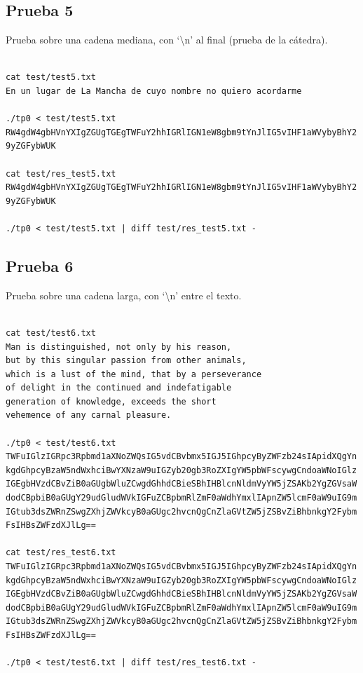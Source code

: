 \documentclass[titlepage,a4paper]{article}
\begin{document}
\subsection{Prueba 5}
Prueba sobre una cadena mediana, con `\textbackslash n' al final (prueba de la cátedra).
\begin{lstlisting}[style=test_run_style]

cat test/test5.txt
En un lugar de La Mancha de cuyo nombre no quiero acordarme

./tp0 < test/test5.txt
RW4gdW4gbHVnYXIgZGUgTGEgTWFuY2hhIGRlIGN1eW8gbm9tYnJlIG5vIHF1aWVybyBhY2 
9yZGFybWUK

cat test/res_test5.txt
RW4gdW4gbHVnYXIgZGUgTGEgTWFuY2hhIGRlIGN1eW8gbm9tYnJlIG5vIHF1aWVybyBhY2 
9yZGFybWUK

./tp0 < test/test5.txt | diff test/res_test5.txt -

\end{lstlisting}

\subsection{Prueba 6}
Prueba sobre una cadena larga, con `\textbackslash n' entre el texto.

\begin{lstlisting}[style=test_run_style]

cat test/test6.txt
Man is distinguished, not only by his reason, 
but by this singular passion from other animals, 
which is a lust of the mind, that by a perseverance 
of delight in the continued and indefatigable 
generation of knowledge, exceeds the short 
vehemence of any carnal pleasure.

./tp0 < test/test6.txt
TWFuIGlzIGRpc3Rpbmd1aXNoZWQsIG5vdCBvbmx5IGJ5IGhpcyByZWFzb24sIApidXQgYn 
kgdGhpcyBzaW5ndWxhciBwYXNzaW9uIGZyb20gb3RoZXIgYW5pbWFscywgCndoaWNoIGlz 
IGEgbHVzdCBvZiB0aGUgbWluZCwgdGhhdCBieSBhIHBlcnNldmVyYW5jZSAKb2YgZGVsaW 
dodCBpbiB0aGUgY29udGludWVkIGFuZCBpbmRlZmF0aWdhYmxlIApnZW5lcmF0aW9uIG9m 
IGtub3dsZWRnZSwgZXhjZWVkcyB0aGUgc2hvcnQgCnZlaGVtZW5jZSBvZiBhbnkgY2Fybm 
FsIHBsZWFzdXJlLg==

cat test/res_test6.txt
TWFuIGlzIGRpc3Rpbmd1aXNoZWQsIG5vdCBvbmx5IGJ5IGhpcyByZWFzb24sIApidXQgYn 
kgdGhpcyBzaW5ndWxhciBwYXNzaW9uIGZyb20gb3RoZXIgYW5pbWFscywgCndoaWNoIGlz 
IGEgbHVzdCBvZiB0aGUgbWluZCwgdGhhdCBieSBhIHBlcnNldmVyYW5jZSAKb2YgZGVsaW 
dodCBpbiB0aGUgY29udGludWVkIGFuZCBpbmRlZmF0aWdhYmxlIApnZW5lcmF0aW9uIG9m 
IGtub3dsZWRnZSwgZXhjZWVkcyB0aGUgc2hvcnQgCnZlaGVtZW5jZSBvZiBhbnkgY2Fybm 
FsIHBsZWFzdXJlLg==

./tp0 < test/test6.txt | diff test/res_test6.txt -

\end{lstlisting}
\end{document}
